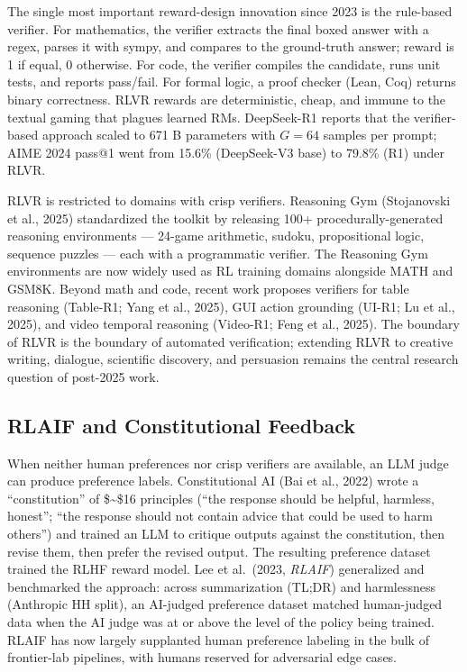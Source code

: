The single most important reward-design innovation since 2023 is the rule-based verifier. For mathematics, the verifier extracts the final boxed answer with a regex, parses it with sympy, and compares to the ground-truth answer; reward is 1 if equal, 0 otherwise. For code, the verifier compiles the candidate, runs unit tests, and reports pass/fail. For formal logic, a proof checker (Lean, Coq) returns binary correctness. RLVR rewards are deterministic, cheap, and immune to the textual gaming that plagues learned RMs. DeepSeek-R1 reports that the verifier-based approach scaled to 671 B parameters with \(G = 64\) samples per prompt; AIME 2024 pass@1 went from 15.6\% (DeepSeek-V3 base) to 79.8\% (R1) under RLVR.

RLVR is restricted to domains with crisp verifiers. Reasoning Gym (Stojanovski et al., 2025) standardized the toolkit by releasing 100+ procedurally-generated reasoning environments --- 24-game arithmetic, sudoku, propositional logic, sequence puzzles --- each with a programmatic verifier. The Reasoning Gym environments are now widely used as RL training domains alongside MATH and GSM8K. Beyond math and code, recent work proposes verifiers for table reasoning (Table-R1; Yang et al., 2025), GUI action grounding (UI-R1; Lu et al., 2025), and video temporal reasoning (Video-R1; Feng et al., 2025). The boundary of RLVR is the boundary of automated verification; extending RLVR to creative writing, dialogue, scientific discovery, and persuasion remains the central research question of post-2025 work.

\subsection{RLAIF and Constitutional Feedback}\label{rlaif-and-constitutional-feedback}

When neither human preferences nor crisp verifiers are available, an LLM judge can produce preference labels. Constitutional AI (Bai et al., 2022) wrote a ``constitution'' of \$\sim\$16 principles (``the response should be helpful, harmless, honest''; ``the response should not contain advice that could be used to harm others'') and trained an LLM to critique outputs against the constitution, then revise them, then prefer the revised output. The resulting preference dataset trained the RLHF reward model. Lee et al.~(2023, \emph{RLAIF}) generalized and benchmarked the approach: across summarization (TL;DR) and harmlessness (Anthropic HH split), an AI-judged preference dataset matched human-judged data when the AI judge was at or above the level of the policy being trained. RLAIF has now largely supplanted human preference labeling in the bulk of frontier-lab pipelines, with humans reserved for adversarial edge cases.

